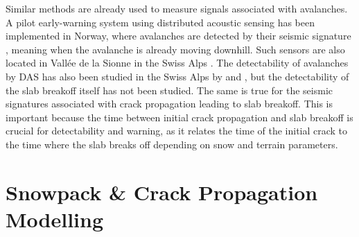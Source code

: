   
  Similar methods are already used to measure signals associated with avalanches. A pilot early-warning system using distributed acoustic sensing has been implemented in Norway, where avalanches are detected by their seismic signature \parencite{turquetAutomatedSnowAvalanche2024}, meaning when the avalanche is already moving downhill. Such sensors are also located in Vallée de la Sionne in the Swiss Alps \parencite{paitzPhenomenologyAvalancheRecordings2023}. The detectability of avalanches by DAS has also been studied in the Swiss Alps by \cite{paitzPhenomenologyAvalancheRecordings2023} and \cite{edmeFiberopticDetectionSnow2023}, but the detectability of the slab breakoff itself has not been studied. The same is true for the seismic signatures associated with crack propagation leading to slab breakoff. This is important because the time between initial crack propagation and slab breakoff is crucial for detectability and warning, as it relates the time of the initial crack to the time where the slab breaks off depending on snow and terrain parameters. \par

  

\section{Snowpack \& Crack Propagation Modelling } 
  
